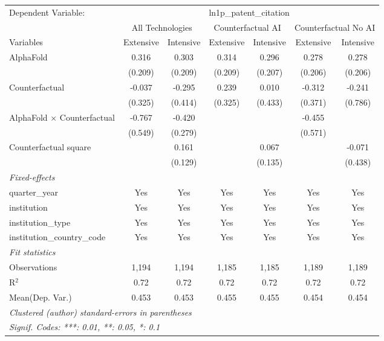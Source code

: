 \begingroup
\centering
\begin{tabular}{lcccccc}
   \tabularnewline \midrule \midrule
   Dependent Variable: & \multicolumn{6}{c}{ln1p\_patent\_citation}\\
 & \multicolumn{2}{c}{All Technologies} & \multicolumn{2}{c}{Counterfactual AI} & \multicolumn{2}{c}{Counterfactual No AI} \\
\cmidrule(lr){1-1}\cmidrule(lr){2-3} \cmidrule(lr){4-5} \cmidrule(lr){6-7}
Variables & \multicolumn{1}{c}{Extensive} & \multicolumn{1}{c}{Intensive} & \multicolumn{1}{c}{Extensive} & \multicolumn{1}{c}{Intensive} & \multicolumn{1}{c}{Extensive} & \multicolumn{1}{c}{Intensive} \\
\cmidrule(lr){1-1}\cmidrule(lr){2-2} \cmidrule(lr){3-3} \cmidrule(lr){4-4} \cmidrule(lr){5-5} \cmidrule(lr){6-6} \cmidrule(lr){7-7}
   AlphaFold                          & 0.316   & 0.303   & 0.314   & 0.296   & 0.278   & 0.278\\   
                                      & (0.209) & (0.209) & (0.209) & (0.207) & (0.206) & (0.206)\\   
   Counterfactual                     & -0.037  & -0.295  & 0.239   & 0.010   & -0.312  & -0.241\\   
                                      & (0.325) & (0.414) & (0.325) & (0.433) & (0.371) & (0.786)\\   
   AlphaFold $\times$ Counterfactual  & -0.767  & -0.420  &         &         & -0.455  &   \\   
                                      & (0.549) & (0.279) &         &         & (0.571) &   \\   
   Counterfactual square              &         & 0.161   &         & 0.067   &         & -0.071\\   
                                      &         & (0.129) &         & (0.135) &         & (0.438)\\   
   \midrule
   \emph{Fixed-effects}\\
   quarter\_year                      & Yes     & Yes     & Yes     & Yes     & Yes     & Yes\\  
   institution                        & Yes     & Yes     & Yes     & Yes     & Yes     & Yes\\  
   institution\_type                  & Yes     & Yes     & Yes     & Yes     & Yes     & Yes\\  
   institution\_country\_code         & Yes     & Yes     & Yes     & Yes     & Yes     & Yes\\  
   \midrule
   \emph{Fit statistics}\\
   Observations                       & 1,194   & 1,194   & 1,185   & 1,185   & 1,189   & 1,189\\  
   R$^2$                              & 0.72    & 0.72    & 0.72    & 0.72    & 0.72    & 0.72\\  
Mean(Dep. Var.) & 0.453 & 0.453 & 0.455 & 0.455 & 0.454 & 0.454 \\
   \midrule \midrule
   \multicolumn{7}{l}{\emph{Clustered (author) standard-errors in parentheses}}\\
   \multicolumn{7}{l}{\emph{Signif. Codes: ***: 0.01, **: 0.05, *: 0.1}}\\
\end{tabular}
\par\endgroup
